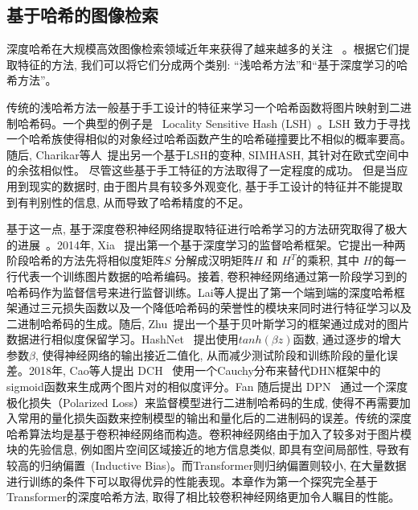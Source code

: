 \subsection{基于哈希的图像检索}
深度哈希在大规模高效图像检索领域近年来获得了越来越多的关注~\cite{chen2021dvhn, ge2013optimized, gong2012iterative, heo2012spherical} \cite{indyk1997locality, yu2018product, weiss2008spectral}。根据它们提取特征的方法, 我们可以将它们分成两个类别: ``浅哈希方法''和``基于深度学习的哈希方法''。 \par
传统的浅哈希方法一般基于手工设计的特征来学习一个哈希函数将图片映射到二进制哈希码。一个典型的例子是~ Locality Sensitive Hash (LSH)~\cite{indyk1997locality}。LSH 致力于寻找一个哈希族使得相似的对象经过哈希函数产生的哈希碰撞要比不相似的概率要高。随后, Charikar等人~\cite{charikar2002similarity}提出另一个基于LSH的变种, SIMHASH, 其针对在欧式空间中的余弦相似性。 尽管这些基于手工特征的方法取得了一定程度的成功。 但是当应用到现实的数据时, 由于图片具有较多外观变化, 基于手工设计的特征并不能提取到有判别性的信息, 从而导致了哈希精度的不足。\par
基于这一点, 基于深度卷积神经网络提取特征进行哈希学习的方法研究取得了极大的进展~\cite{cao2017hashnet, fan20deep, li2015feature, liu2016deep, zhu2016deep}。2014年, Xia~\cite{xia2014supervised} 提出第一个基于深度学习的监督哈希框架。它提出一种两阶段哈希的方法先将相似度矩阵$S$ 分解成汉明矩阵$H$ 和 $H^T$的乘积, 其中 $H$的每一行代表一个训练图片数据的哈希编码。接着, 卷积神经网络通过第一阶段学习到的哈希码作为监督信号来进行监督训练。Lai等人提出了第一个端到端的深度哈希框架通过三元损失函数以及一个降低哈希码的荣誉性的模块来同时进行特征学习以及二进制哈希码的生成。随后, Zhu~\cite{liu2016deep}提出一个基于贝叶斯学习的框架通过成对的图片数据进行相似度保留学习。HashNet~\cite{cao2017hashnet} 提出使用$tanh(\beta z)$函数, 通过逐步的增大参数$\beta$, 使得神经网络的输出接近二值化, 从而减少测试阶段和训练阶段的量化误差。2018年, Cao等人提出 DCH~\cite{cao2018deep} 使用一个Cauchy分布来替代DHN框架中的sigmoid函数来生成两个图片对的相似度评分。Fan 随后提出 DPN~\cite{fan2020deep} 通过一个深度极化损失（Polarized Loss）来监督模型进行二进制哈希码的生成, 使得不再需要加入常用的量化损失函数来控制模型的输出和量化后的二进制码的误差。传统的深度哈希算法均是基于卷积神经网络而构造。卷积神经网络由于加入了较多对于图片模块的先验信息, 例如图片空间区域接近的地方信息类似, 即具有空间局部性, 导致有较高的归纳偏置~(Inductive Bias)。而Transformer则归纳偏置则较小, 在大量数据进行训练的条件下可以取得优异的性能表现。本章作为第一个探究完全基于Transformer的深度哈希方法, 取得了相比较卷积神经网络更加令人瞩目的性能。


